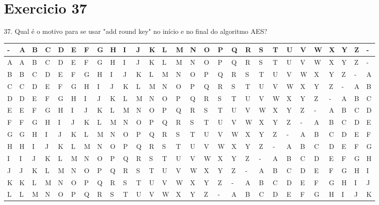 \documentclass[10pt,a4paper]{article}
\begin{document}
\section*{Exercicio 37}
37. Qual é o motivo para se usar "add round key" no início e no final do algoritmo AES?
\newpage
\begin{landscape}
\begin{table}[!htb]
    \begin{tabular}{|l|l|l|l|l|l|l|l|l|l|l|l|l|l|l|l|l|l|l|l|l|l|l|l|l|l|l|l|}
        \hline
        - & A & B & C & D & E & F & G & H & I & J & K & L & M & N & O & P & Q & R & S & T & U & V & W & X & Y & Z & - \\ \hline
        A & A & B & C & D & E & F & G & H & I & J & K & L & M & N & O & P & Q & R & S & T & U & V & W & X & Y & Z & - \\ 
        B & B & C & D & E & F & G & H & I & J & K & L & M & N & O & P & Q & R & S & T & U & V & W & X & Y & Z & - & A \\ 
        C & C & D & E & F & G & H & I & J & K & L & M & N & O & P & Q & R & S & T & U & V & W & X & Y & Z & - & A & B \\ 
        D & D & E & F & G & H & I & J & K & L & M & N & O & P & Q & R & S & T & U & V & W & X & Y & Z & - & A & B & C \\ 
        E & E & F & G & H & I & J & K & L & M & N & O & P & Q & R & S & T & U & V & W & X & Y & Z & - & A & B & C & D \\ 
        F & F & G & H & I & J & K & L & M & N & O & P & Q & R & S & T & U & V & W & X & Y & Z & - & A & B & C & D & E \\ 
        G & G & H & I & J & K & L & M & N & O & P & Q & R & S & T & U & V & W & X & Y & Z & - & A & B & C & D & E & F \\ 
        H & H & I & J & K & L & M & N & O & P & Q & R & S & T & U & V & W & X & Y & Z & - & A & B & C & D & E & F & G \\ 
        I & I & J & K & L & M & N & O & P & Q & R & S & T & U & V & W & X & Y & Z & - & A & B & C & D & E & F & G & H \\ 
        J & J & K & L & M & N & O & P & Q & R & S & T & U & V & W & X & Y & Z & - & A & B & C & D & E & F & G & H & I \\ 
        K & K & L & M & N & O & P & Q & R & S & T & U & V & W & X & Y & Z & - & A & B & C & D & E & F & G & H & I & J \\ 
        L & L & M & N & O & P & Q & R & S & T & U & V & W & X & Y & Z & - & A & B & C & D & E & F & G & H & I & J & K \\ 

\end{tabular}
\end{table}
\end{landscape}
\end{document}

